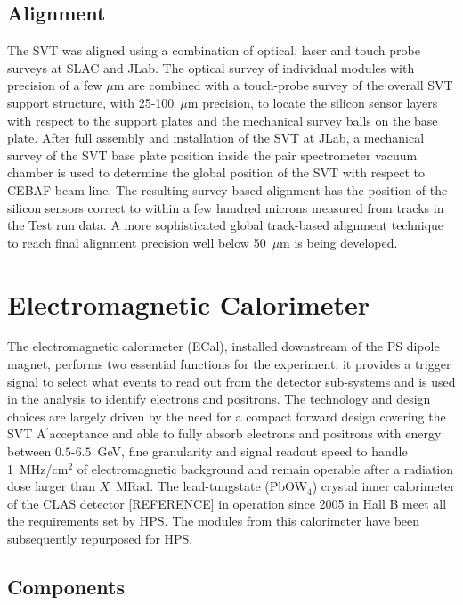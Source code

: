 \documentclass[final,3p,times,twocolumn]{elsarticle}
\newcommand{\Aprime}{A\ensuremath{^\prime}}
\begin{document}
\subsection{Alignment}
The SVT was aligned using a combination of optical, laser and touch probe surveys at SLAC and JLab. 
The optical survey of individual modules with precision of a few $\mu$m are combined with a 
touch-probe survey of the overall SVT support structure, with 25-100~$\mu$m precision, to locate the 
silicon sensor layers with respect to the support plates and the mechanical survey balls on the base 
plate. After full assembly and installation of the SVT at JLab, a mechanical survey of the SVT base plate 
position inside the pair spectrometer vacuum chamber is used to determine the global position of the 
SVT with respect to CEBAF beam line. The resulting survey-based alignment has the position of the 
silicon sensors correct to within a few hundred microns measured from tracks in the Test run data. 
A more sophisticated global track-based alignment technique to reach final alignment precision 
well below 50~$\mu$m is being developed.




\section{Electromagnetic Calorimeter}
\label{sec:ecal}

The electromagnetic calorimeter (ECal), installed downstream of the PS dipole magnet, performs two 
essential 
functions for the experiment: it provides a trigger signal to select what events to read out from the 
detector sub-systems and is used in the analysis to identify electrons and positrons. 
The technology and design choices are largely driven by the need for a compact forward design 
covering the SVT \Aprime acceptance and able to fully absorb 
electrons and positrons with energy between $0.5$-$6.5$~GeV, fine granularity and signal 
readout speed to handle 1~MHz/cm$^{2}$ of electromagnetic background and remain operable 
after a radiation dose larger than $X$~MRad. The lead-tungstate (PbOW$_{4}$) crystal inner 
calorimeter of the CLAS detector [REFERENCE] in operation since 2005 in Hall B meet all the 
requirements set by HPS. The modules from this calorimeter have been subsequently repurposed for 
HPS. 


\subsection{Components}
\end{document}
